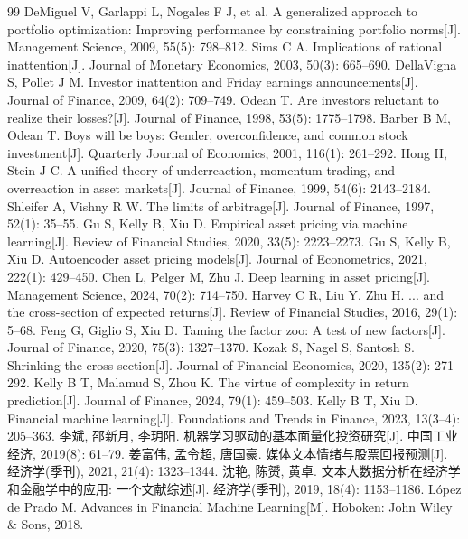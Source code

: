 \begin{thebibliography}{99}
 DeMiguel V, Garlappi L, Nogales F J, et al. A generalized approach to portfolio optimization: Improving performance by constraining portfolio norms[J]. Management Science, 2009, 55(5): 798--812.
 Sims C A. Implications of rational inattention[J]. Journal of Monetary Economics, 2003, 50(3): 665--690.
 DellaVigna S, Pollet J M. Investor inattention and Friday earnings announcements[J]. Journal of Finance, 2009, 64(2): 709--749.
 Odean T. Are investors reluctant to realize their losses?[J]. Journal of Finance, 1998, 53(5): 1775--1798.
 Barber B M, Odean T. Boys will be boys: Gender, overconfidence, and common stock investment[J]. Quarterly Journal of Economics, 2001, 116(1): 261--292.
 Hong H, Stein J C. A unified theory of underreaction, momentum trading, and overreaction in asset markets[J]. Journal of Finance, 1999, 54(6): 2143--2184.
 Shleifer A, Vishny R W. The limits of arbitrage[J]. Journal of Finance, 1997, 52(1): 35--55.
 Gu S, Kelly B, Xiu D. Empirical asset pricing via machine learning[J]. Review of Financial Studies, 2020, 33(5): 2223--2273.
 Gu S, Kelly B, Xiu D. Autoencoder asset pricing models[J]. Journal of Econometrics, 2021, 222(1): 429--450.
 Chen L, Pelger M, Zhu J. Deep learning in asset pricing[J]. Management Science, 2024, 70(2): 714--750.
 Harvey C R, Liu Y, Zhu H. ... and the cross-section of expected returns[J]. Review of Financial Studies, 2016, 29(1): 5--68.
 Feng G, Giglio S, Xiu D. Taming the factor zoo: A test of new factors[J]. Journal of Finance, 2020, 75(3): 1327--1370.
 Kozak S, Nagel S, Santosh S. Shrinking the cross-section[J]. Journal of Financial Economics, 2020, 135(2): 271--292.
 Kelly B T, Malamud S, Zhou K. The virtue of complexity in return prediction[J]. Journal of Finance, 2024, 79(1): 459--503.
 Kelly B T, Xiu D. Financial machine learning[J]. Foundations and Trends in Finance, 2023, 13(3--4): 205--363.
 李斌, 邵新月, 李玥阳. 机器学习驱动的基本面量化投资研究[J]. 中国工业经济, 2019(8): 61--79.
 姜富伟, 孟令超, 唐国豪. 媒体文本情绪与股票回报预测[J]. 经济学(季刊), 2021, 21(4): 1323--1344.
 沈艳, 陈赟, 黄卓. 文本大数据分析在经济学和金融学中的应用: 一个文献综述[J]. 经济学(季刊), 2019, 18(4): 1153--1186.
 López de Prado M. Advances in Financial Machine Learning[M]. Hoboken: John Wiley \& Sons, 2018.

\end{thebibliography}
